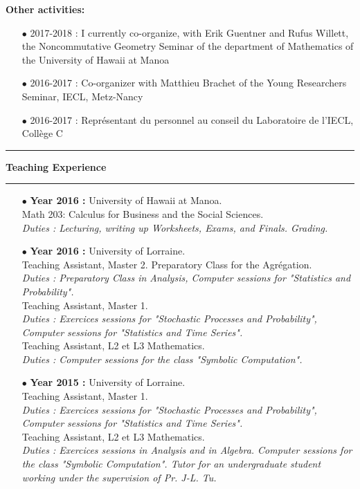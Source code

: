 \documentclass[a4paper,11pt]{article}
\newcommand\espace{\vrule height 20pt width 0pt}
\newcommand{\titre}[1]{%
	\begin{center}
	\bigskip
	\rule{\textwidth}{1pt}
	\par\vspace{0.1cm}
        \textbf{\large #1}
	\par\rule{\textwidth}{1pt}
	\end{center}
	\bigskip
	}
\begin{document}
\espace
\textbf{Other activities:} 
\begin{itemize}
\item[$\bullet$] 2017-2018 : I currently co-organize, with Erik Guentner and Rufus Willett, the Noncommutative Geometry Seminar of the department of Mathematics of the University of Hawaii at Manoa
\item[$\bullet$] 2016-2017 : Co-organizer with Matthieu Brachet of the Young Researchers Seminar, IECL, Metz-Nancy
\item[$\bullet$] 2016-2017 : Représentant du personnel au conseil du Laboratoire de l'IECL, Collège C
\end{itemize}

\newpage
\titre{Teaching Experience}

\begin{itemize}
\item[$\bullet$] \textbf{ Year 2016 :} University of Hawaii at Manoa.\\
					Math 203: Calculus for Business and the Social Sciences.\\
					\textit{Duties : Lecturing, writing up Worksheets, Exams, and Finals. Grading.}\\

\item[$\bullet$] \textbf{ Year 2016 :} University of Lorraine.\\
					Teaching Assistant, Master 2. Preparatory Class for the Agrégation.\\
					\textit{Duties : Preparatory Class in Analysis, Computer sessions for "Statistics and Probability".}\\
					Teaching Assistant, Master 1.\\
					\textit{Duties : Exercices sessions for "Stochastic Processes and Probability", Computer sessions for "Statistics and Time Series".}\\
					Teaching Assistant, L2 et L3 Mathematics. \\
					\textit{Duties : Computer sessions for the class "Symbolic Computation".}\\   
\item[$\bullet$] \textbf{ Year 2015 :} University of Lorraine.\\
					Teaching Assistant, Master 1.\\
					\textit{Duties : Exercices sessions for "Stochastic Processes and Probability", Computer sessions for "Statistics and Time Series".}\\
					Teaching Assistant, L2 et L3 Mathematics. \\
					\textit{Duties : Exercices sessions in Analysis and in Algebra. Computer sessions for the class "Symbolic Computation". Tutor for an undergraduate student working under the supervision of Pr. J-L. Tu.}\\   
					

\end{itemize}
\end{document}
